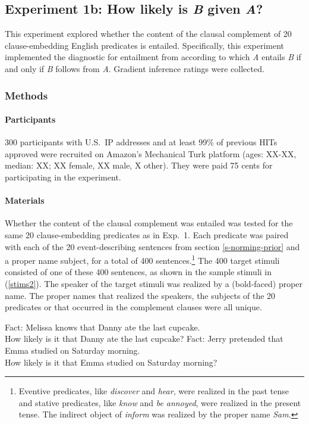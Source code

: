 \documentclass[11pt,fleqn]{article}
\newcommand{\6}{\mbox{$[\hspace*{-.6mm}[$}}
\newcommand{\9}{\mbox{$]\hspace*{-.6mm}]$}}
\begin{document}
\subsection{Experiment 1b: How likely is {\em B} given {\em A}?}

This experiment explored whether the content of the clausal complement of 20 clause-embedding English predicates is entailed. Specifically, this experiment implemented the diagnostic for entailment from \citealt{ccmg90} according to which {\em A} entails {\em B} if and only if {\em B} follows from {\em A}. Gradient inference ratings were collected.

\subsubsection{Methods}\label{s-methods2}

\paragraph{Participants} 300 participants with U.S.\ IP addresses and at least 99\% of previous HITs approved were recruited on Amazon's Mechanical Turk platform (ages: XX-XX, median: XX; XX female, XX male, X other). They were paid 75 cents for participating in the experiment.

\paragraph{Materials} Whether the content of the clausal complement was entailed was tested for the same 20 clause-embedding predicates as in Exp.~1. Each predicate was paired with each of the 20 event-describing sentences from section \ref{s-norming-prior} and a proper name subject, for a total of 400 sentences.\footnote{Eventive predicates, like {\em discover} and {\em hear}, were realized in the past tense and stative predicates, like {\em know} and {\em be annoyed}, were realized in the present tense. The indirect object of {\em inform} was realized by the proper name {\em Sam}.} The 400 target stimuli consisted of one of these 400 sentences, as shown in the sample stimuli in (\ref{stims2}). The speaker of the target stimuli was realized by a (bold-faced) proper name. The proper names that realized the speakers, the subjects of the 20 predicates or that occurred in the complement clauses were all unique. 

\begin{exe}
\ex\label{stims2}
\begin{xlist}
\ex Fact: Melissa knows that Danny ate the last cupcake.
\\ How likely is it that Danny ate the last cupcake?
\ex Fact: Jerry pretended that Emma studied on Saturday morning.
\\ How likely is it that Emma studied on Saturday morning?
\end{xlist}
\end{exe}
\end{document}
